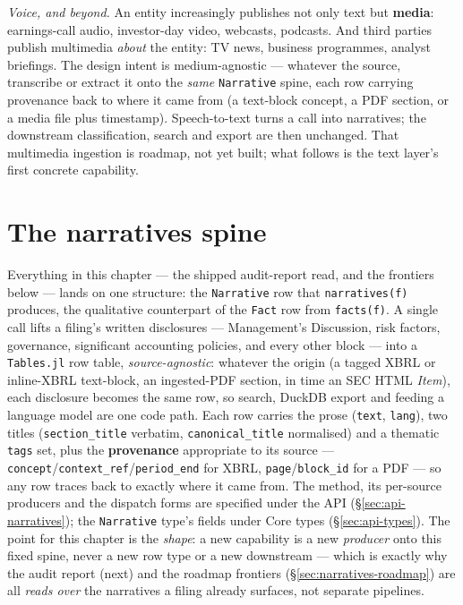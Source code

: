 \documentclass[11pt,a4paper]{report}
\begin{document}
\emph{Voice, and beyond.} An entity increasingly publishes not only text but \textbf{media}: earnings-call
audio, investor-day video, webcasts, podcasts. And third parties publish multimedia \emph{about} the
entity: TV news, business programmes, analyst briefings. The design intent is medium-agnostic --- whatever
the source, transcribe or extract it onto the \emph{same} \texttt{Narrative} spine, each row carrying
provenance back to where it came from (a text-block concept, a PDF section, or a media file plus
timestamp). Speech-to-text turns a call into narratives; the downstream classification, search and export
are then unchanged. That multimedia ingestion is roadmap, not yet built; what follows is the text layer's
first concrete capability.

\section{The narratives spine}
\label{sec:narratives-spine}

Everything in this chapter --- the shipped audit-report read, and the frontiers below --- lands on one
structure: the \texttt{Narrative} row that \texttt{narratives(f)} produces, the qualitative counterpart of the
\texttt{Fact} row from \texttt{facts(f)}. A single call lifts a filing's written disclosures --- Management's
Discussion, risk factors, governance, significant accounting policies, and every other block --- into a
\texttt{Tables.jl} row table, \emph{source-agnostic}: whatever the origin (a tagged XBRL or inline-XBRL
text-block, an ingested-PDF section, in time an SEC HTML \emph{Item}), each disclosure becomes the same row,
so search, DuckDB export and feeding a language model are one code path. Each row carries the prose
(\texttt{text}, \texttt{lang}), two titles (\texttt{section\_title} verbatim, \texttt{canonical\_title}
normalised) and a thematic \texttt{tags} set, plus the \textbf{provenance} appropriate to its source ---
\texttt{concept}/\texttt{context\_ref}/\texttt{period\_end} for XBRL, \texttt{page}/\texttt{block\_id} for a
PDF --- so any row traces back to exactly where it came from. The method, its per-source producers and the
dispatch forms are specified under the API (\S\ref{sec:api-narratives}); the \texttt{Narrative} type's fields
under Core types (\S\ref{sec:api-types}). The point for this chapter is the \emph{shape}: a new capability is
a new \emph{producer} onto this fixed spine, never a new row type or a new downstream --- which is exactly why
the audit report (next) and the roadmap frontiers (\S\ref{sec:narratives-roadmap}) are all \emph{reads over}
the narratives a filing already surfaces, not separate pipelines.
\end{document}
